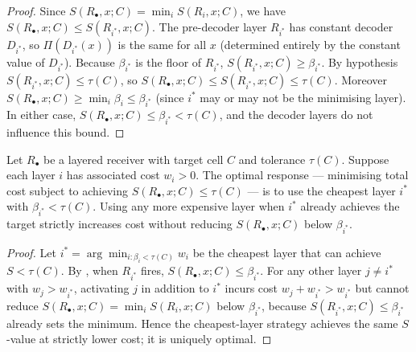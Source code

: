 \documentclass[twocolumn,11pt,a4paper]{article}
\begin{document}
\begin{proof}
Since $S(R_\bullet,x;C)=\min_i S(R_i,x;C)$, we have
$S(R_\bullet,x;C)\leq S(R_{i^*},x;C)$.  The pre-decoder layer $R_{i^*}$
has constant decoder $D_{i^*}$, so $\Pi(D_{i^*}(x))$ is the same for all
$x$ (determined entirely by the constant value of $D_{i^*}$).  Because
$\beta_{i^*}$ is the floor of $R_{i^*}$,
$S(R_{i^*},x;C)\geq\beta_{i^*}$.  By hypothesis $S(R_{i^*},x;C)\leq
\tau(C)$, so $S(R_\bullet,x;C)\leq S(R_{i^*},x;C)\leq\tau(C)$.
Moreover $S(R_\bullet,x;C)\geq\min_i\beta_i\leq\beta_{i^*}$ (since
$i^*$ may or may not be the minimising layer).  In either case,
$S(R_\bullet,x;C)\leq\beta_{i^*}<\tau(C)$, and the decoder layers do
not influence this bound.
\end{proof}

\begin{theorem}
\label{thm:selectiverationality}
Let $R_\bullet$ be a layered receiver with target cell $C$ and tolerance
$\tau(C)$.  Suppose each layer $i$ has associated cost $w_i>0$.  The
optimal response — minimising total cost subject to achieving
$S(R_\bullet,x;C)\leq\tau(C)$ — is to use the cheapest layer $i^*$
with $\beta_{i^*}<\tau(C)$.  Using any more expensive layer when $i^*$
already achieves the target strictly increases cost without reducing
$S(R_\bullet,x;C)$ below $\beta_{i^*}$.
\end{theorem}

\begin{proof}
Let $i^*=\arg\min_{i:\beta_i<\tau(C)} w_i$ be the cheapest layer that
can achieve $S<\tau(C)$.  By , when $R_{i^*}$
fires, $S(R_\bullet,x;C)\leq\beta_{i^*}$.  For any other layer $j\neq
i^*$ with $w_j>w_{i^*}$, activating $j$ in addition to $i^*$ incurs
cost $w_j+w_{i^*}>w_{i^*}$ but cannot reduce
$S(R_\bullet,x;C)=\min_i S(R_i,x;C)$ below $\beta_{i^*}$, because
$S(R_{i^*},x;C)\leq\beta_{i^*}$ already sets the minimum.  Hence the
cheapest-layer strategy achieves the same $S$-value at strictly lower
cost; it is uniquely optimal.
\end{proof}
\end{document}
